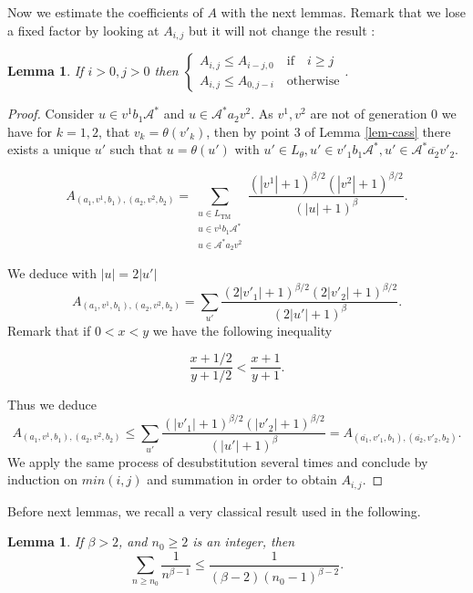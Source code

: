 \documentclass[11 pt]{article}
\newtheorem{lemma}[proposition]{Lemma}
\def\be{\beta}
\theoremstyle{definition}
\begin{document}
Now we estimate the coefficients of $A$ with the next lemmas. Remark that we lose a fixed factor by looking at $A_{i,j}$ but it will not change the result :


\begin{lemma}
If $i>0, j>0$ then $\begin{cases} A_{i,j}\leq A_{i-j,0}\quad  \text{if}\quad i\geq j\\ A_{i,j}\leq A_{0,j-i} \quad \text{otherwise}\end{cases}$.
\end{lemma}
\begin{proof}
Consider $u\in v^1b_1\mathcal{A}^*$ and $u\in \mathcal{A}^*a_2v^2$. As $v^1, v^2$ are not of generation $0$ we have for $k=1,2$, that $v_k=\theta(v'_k)$, then by  point 3 of Lemma \ref{lem-cass} there exists a unique $u'$ such that $u=\theta(u')$   with $u'\in L_\theta, u'\in v'_1b_1\mathcal{A}^*, u'\in \mathcal{A}^* \overline{a_2}v'_2$.

$$A_{(a_1,v^1,b_1), (a_2,v^2,b_2)}=\sum_{\substack{u\in L_{\mathrm{TM}}\\ u\in v^1b_1\mathcal{A}^*\\ u\in \mathcal{A}^*a_2v^2}} \frac{(|v^1|+1)^{\beta/2}(|v^2|+1)^{\beta/2}}{(|u|+1)^\beta}.$$


We deduce with $|u|= 2|u'|$
$$ A_{(a_1,v^1,b_1), (a_2,v^2,b_2)}=\sum_{u'}\frac{(2|v'_1|+1)^{\beta/2}(2|v'_2|+1)^{\beta/2}}{(2|u'|+1)^\beta}.$$
Remark that if $0<x<y$ we have the following inequality

\begin{equation}\label{inegalite}
\frac{x+1/2}{y+1/2}<\frac{x+1}{y+1}.
\end{equation} 

Thus we deduce
$$A_{(a_1,v^1,b_1), (a_2,v^2,b_2)}\leq \sum_{u'}\frac{(|v'_1|+1)^{\beta/2}(|v'_2|+1)^{\beta/2}}{(|u'|+1)^\beta}=A_{(\overline{a_1},v'_1,b_1), (\overline{a_2},v'_2,b_2)}.$$
We apply the same process of desubstitution several times and conclude by induction on $min(i,j)$ and summation in order to obtain $A_{i,j}$.
\end{proof}

Before next lemmas, we recall a very classical result used in the following.
\begin{lemma}\label{lem-integrale}
If $\be>2$, and $n_0\geq 2$ is an integer, then 
$$\sum_{n\geq n_0} \frac{1}{n^{\beta-1}}\leq \frac{1}{(\beta-2)(n_0-1)^{\beta-2}}.$$
\end{lemma}
\end{document}
